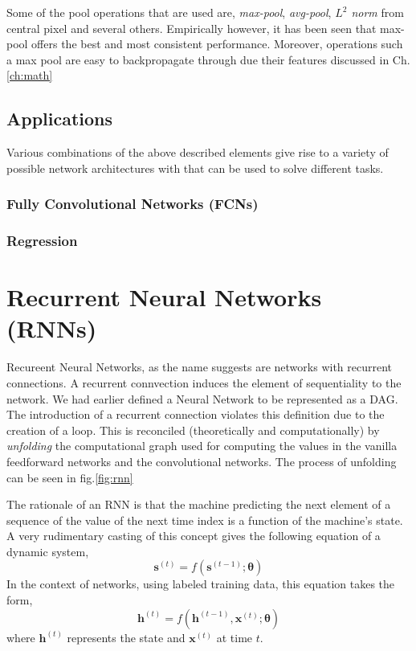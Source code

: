 Some of the pool operations that are used are, \textit{max-pool}, \textit{avg-pool}, \textit{$L^2$ norm} from central pixel and several others. Empirically however, it has been seen that max-pool offers the best and most consistent performance. Moreover, operations such a max pool are easy to backpropagate through due their features discussed in Ch.\ref{ch:math}


\subsection*{Applications}
Various combinations of the above described elements give rise to a variety of possible network architectures with that can be used to solve different tasks.

\subsubsection*{Fully Convolutional Networks (FCNs)}
\subsubsection*{Regression}

\section{Recurrent Neural Networks (RNNs)}
Recureent Neural Networks, as the name suggests are networks with recurrent connections. A recurrent connvection induces the element of sequentiality to the network. We had earlier defined a Neural Network to be represented as a DAG. The introduction of a recurrent connection violates this definition due to the creation of a loop. This is reconciled (theoretically and computationally) by \textit{unfolding} the computational graph used for computing the values in the vanilla feedforward networks and the convolutional networks. The process of unfolding can be seen in fig.\ref{fig:rnn}

The rationale of an RNN is that the machine predicting the next element of a sequence of the value of the next time index is a function of the machine's state. A very rudimentary casting of this concept gives the following equation of a dynamic system,
\begin{equation}
\bm{s}^{(t)} = f(\bm{s}^{(t-1)};\bm{\theta})
\end{equation}
In the context of networks, using labeled training data, this equation takes the form,
\begin{equation}
\bm{h}^{(t)} = f(\bm{h}^{(t-1)},\bm{x}^{(t)};\bm{\theta})
\end{equation}
where $\bm{h}^{(t)}$ represents the state and $\bm{x}^{(t)}$ at time $t$.

